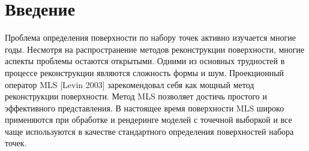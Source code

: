 \section*{Введение} 
Проблема определения поверхности по набору точек активно изучается многие годы. Несмотря на распространение методов реконструкции поверхности, многие аспекты проблемы остаются открытыми. Одними из основных трудностей в процессе реконструкции являются сложность формы и шум.  Проекционный оператор MLS [Levin 2003] зарекомендовал себя как мощный метод реконструкции поверхности. 
Метод MLS позволяет достичь простого и эффективного представления. В настоящее время поверхности MLS широко применяются при обработке и рендеринге моделей с точечной выборкой и все чаще используются в качестве стандартного определения поверхностей набора точек.




